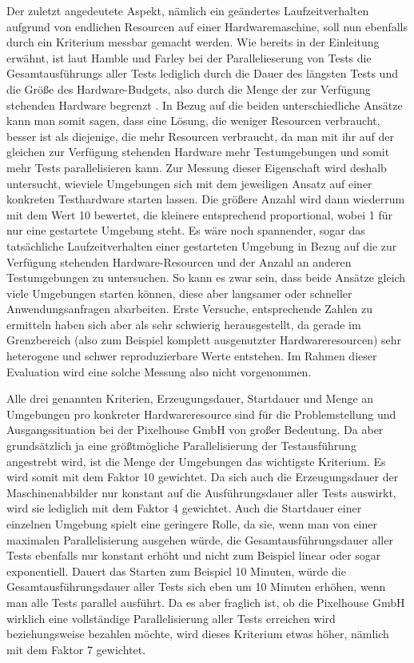 Der zuletzt angedeutete Aspekt, nämlich ein geändertes Laufzeitverhalten aufgrund von endlichen Resourcen auf einer Hardwaremaschine, soll nun ebenfalls durch ein Kriterium messbar gemacht werden. Wie bereits in der Einleitung erwähnt, ist laut Hamble und Farley bei der Parallelieserung von Tests die Gesamtausführungs aller Tests lediglich durch die Dauer des längsten Tests und die Größe des Hardware-Budgets, also durch die Menge der zur Verfügung stehenden Hardware begrenzt \citep[Vgl.][S. 310]{HumFar10}. In Bezug auf die beiden unterschiedliche Ansätze kann man somit sagen, dass eine Lösung, die weniger Resourcen verbraucht, besser ist als diejenige, die mehr Resourcen verbraucht, da man mit ihr auf der gleichen zur Verfügung stehenden Hardware mehr Testumgebungen und somit mehr Tests parallelisieren kann. Zur Messung dieser Eigenschaft wird deshalb untersucht, wieviele Umgebungen sich mit dem jeweiligen Ansatz auf einer konkreten Testhardware starten lassen. Die größere Anzahl wird dann wiederrum mit dem Wert 10 bewertet, die kleinere entsprechend proportional, wobei 1 für nur eine gestartete Umgebung steht. Es wäre noch spannender, sogar das tatsächliche Laufzeitverhalten einer gestarteten Umgebung in Bezug auf die zur Verfügung stehenden Hardware-Resourcen und der Anzahl an anderen Testumgebungen zu untersuchen. So kann es zwar sein, dass beide Ansätze gleich viele Umgebungen starten können, diese aber langsamer oder schneller Anwendungsanfragen abarbeiten. Erste Versuche, entsprechende Zahlen zu ermitteln haben sich aber als sehr schwierig herausgestellt, da gerade im Grenzbereich (also zum Beispiel komplett ausgenutzter Hardwareresourcen) sehr heterogene und schwer reproduzierbare Werte entstehen. Im Rahmen dieser Evaluation wird eine solche Messung also nicht vorgenommen.

Alle drei genannten Kriterien, Erzeugungsdauer, Startdauer und Menge an Umgebungen pro konkreter Hardwareresource sind für die Problemstellung und Ausgangssituation bei der Pixelhouse GmbH von großer Bedeutung. Da aber grundsätzlich ja eine größtmögliche Parallelisierung der Testausführung angestrebt wird, ist die Menge der Umgebungen das wichtigste Kriterium. Es wird somit mit dem Faktor 10 gewichtet. Da sich auch die Erzeugungsdauer der Maschinenabbilder nur konstant auf die Ausführungsdauer aller Tests auswirkt, wird sie lediglich mit dem Faktor 4 gewichtet. Auch die Startdauer einer einzelnen Umgebung spielt eine geringere Rolle, da sie, wenn man von einer maximalen Parallelisierung ausgehen würde, die Gesamtausführungsdauer aller Tests ebenfalls nur konstant erhöht und nicht zum Beispiel linear oder sogar exponentiell. Dauert das Starten zum Beispiel 10 Minuten, würde die Gesamtausführungsdauer aller Tests sich eben um 10 Minuten erhöhen, wenn man alle Tests parallel ausführt. Da es aber fraglich ist, ob die Pixelhouse GmbH wirklich eine vollständige Parallelisierung aller Tests erreichen wird beziehungsweise bezahlen möchte, wird dieses Kriterium etwas höher, nämlich mit dem Faktor 7 gewichtet.

